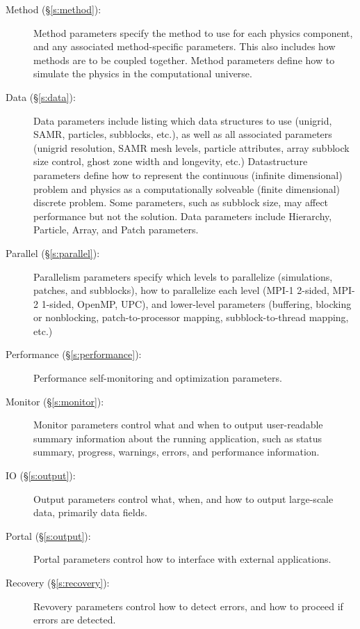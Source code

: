 \begin{description}
 \item [Method (\S\ref{s:method}): ] Method parameters specify the
 method to use for each physics component, and any associated
 method-specific parameters.  This also includes how methods are to be
 coupled together.  Method parameters define how to simulate the
 physics in the computational universe.

 \item [Data (\S\ref{s:data}): ] Data parameters include listing which
 data structures to use (unigrid, SAMR, particles, subblocks, etc.),
 as well as all associated parameters (unigrid resolution, SAMR mesh
 levels, particle attributes, array subblock size control, ghost zone
 width and longevity, etc.)  Datastructure parameters define how to
 represent the continuous (infinite dimensional) problem and physics
 as a computationally solveable (finite dimensional) discrete problem.
 Some parameters, such as subblock size, may affect performance but
 not the solution.  Data parameters include Hierarchy, Particle,
 Array, and Patch parameters.

 \item [Parallel (\S\ref{s:parallel}): ] Parallelism parameters
 specify which levels to parallelize (simulations, patches, and
 subblocks), how to parallelize each level (MPI-1 2-sided, MPI-2
 1-sided, OpenMP, UPC), and lower-level parameters (buffering,
 blocking or nonblocking, patch-to-processor mapping,
 subblock-to-thread mapping, etc.)

 \item [Performance (\S\ref{s:performance}): ] Performance
 self-monitoring and optimization parameters.

 \item [Monitor (\S\ref{s:monitor}): ] Monitor parameters control what
 and when to output user-readable summary information about the
 running application, such as status summary, progress, warnings,
 errors, and performance information.

 \item [IO (\S\ref{s:output}): ] Output parameters control
  what, when, and how to output large-scale data, primarily data fields.

 \item [Portal (\S\ref{s:output}): ] Portal parameters control
  how to interface with external applications.

 \item [Recovery (\S\ref{s:recovery}): ] Revovery parameters
  control how to detect errors, and how to proceed if errors
  are detected.

\end{description}

